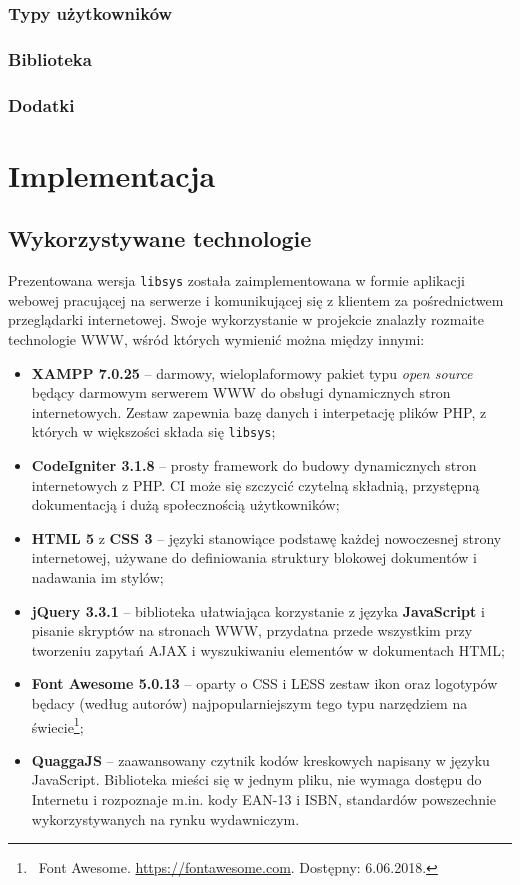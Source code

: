 \documentclass[12pt, a4paper]{article}
\begin{document}
\subsubsection{Typy użytkowników}

\subsubsection{Biblioteka}

\subsubsection{Dodatki}



\section{Implementacja}
\subsection{Wykorzystywane technologie}
Prezentowana wersja \texttt{libsys} została zaimplementowana w formie aplikacji webowej pracującej na serwerze i komunikującej się z klientem za pośrednictwem przeglądarki internetowej. Swoje wykorzystanie w projekcie znalazły rozmaite technologie WWW, wśród których wymienić można między innymi:

\begin{itemize}
    \item \textbf{XAMPP 7.0.25} -- darmowy, wieloplaformowy pakiet typu \textit{open source} będący darmowym serwerem WWW do obsługi dynamicznych stron internetowych. Zestaw zapewnia bazę danych i interpetację plików PHP, z których w większości składa się \texttt{libsys};
    \item \textbf{CodeIgniter 3.1.8} -- prosty framework do budowy dynamicznych stron internetowych z PHP. CI może się szczycić czytelną składnią, przystępną dokumentacją i dużą społecznością użytkowników; 
    \item \textbf{HTML 5} z \textbf{CSS 3} -- języki stanowiące podstawę każdej nowoczesnej strony internetowej, używane do definiowania struktury blokowej dokumentów i nadawania im stylów;
    \item \textbf{jQuery 3.3.1} -- biblioteka ułatwiająca korzystanie z języka \textbf{JavaScript} i pisanie skryptów na stronach WWW, przydatna przede wszystkim przy tworzeniu zapytań AJAX i wyszukiwaniu elementów w dokumentach HTML;
    \item \textbf{Font Awesome 5.0.13} -- oparty o CSS i LESS zestaw ikon oraz logotypów będacy (według autorów) najpopularniejszym tego typu narzędziem na świecie\footnote{\ Font Awesome. \url{https://fontawesome.com}. Dostępny: 6.06.2018.};
    \item \textbf{QuaggaJS} -- zaawansowany czytnik kodów kreskowych napisany w języku JavaScript. Biblioteka mieści się w jednym pliku, nie wymaga dostępu do Internetu i rozpoznaje m.in. kody EAN-13 i ISBN, standardów powszechnie wykorzystywanych na rynku wydawniczym.
\end{itemize}
\end{document}

